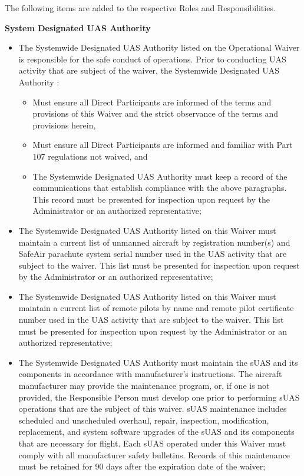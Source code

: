 \documentclass[
]{book}
\providecommand{\tightlist}{%
  \setlength{\itemsep}{0pt}\setlength{\parskip}{0pt}}
\begin{document}
The following items are added to the respective Roles and Responsibilities.

\textbf{System Designated UAS Authority}

\begin{itemize}
\item
  The Systemwide Designated UAS Authority listed on the Operational Waiver is responsible for the safe conduct of operations. Prior to conducting UAS activity that are subject of the waiver, the Systemwide Designated UAS Authority :

  \begin{itemize}
  \tightlist
  \item
    Must ensure all Direct Participants are informed of the terms and provisions of this Waiver and the strict observance of the terms and provisions herein,
  \item
    Must ensure all Direct Participants are informed and familiar with Part 107 regulations not waived, and
  \item
    The Systemwide Designated UAS Authority must keep a record of the communications that establish compliance with the above paragraphs. This record must be presented for inspection upon request by the Administrator or an authorized representative;
  \end{itemize}
\item
  The Systemwide Designated UAS Authority listed on this Waiver must maintain a current list of unmanned aircraft by registration number(s) and SafeAir parachute system serial number used in the UAS activity that are subject to the waiver. This list must be presented for inspection upon request by the Administrator or an authorized representative;
\item
  The Systemwide Designated UAS Authority listed on this Waiver must maintain a current list of remote pilots by name and remote pilot certificate number used in the UAS activity that are subject to the waiver. This list must be presented for inspection upon request by the Administrator or an authorized representative;
\item
  The Systemwide Designated UAS Authority must maintain the sUAS and its components in accordance with manufacturer's instructions. The aircraft manufacturer may provide the maintenance program, or, if one is not provided, the Responsible Person must develop one prior to performing sUAS operations that are the subject of this waiver. sUAS maintenance includes scheduled and unscheduled overhaul, repair, inspection, modification, replacement, and system software upgrades of the sUAS and its components that are necessary for flight. Each sUAS operated under this Waiver must comply with all manufacturer safety bulletins. Records of this maintenance must be retained for 90 days after the expiration date of the waiver;

\end{itemize}
\end{document}
